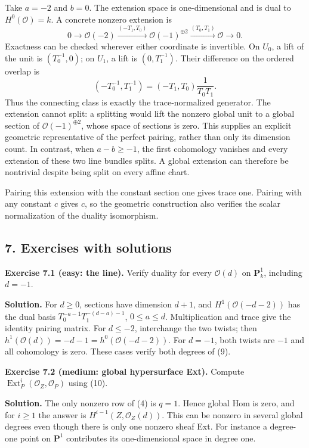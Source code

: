 \documentclass[11pt]{article}
\begin{document}
Take \(a=-2\) and \(b=0\). The extension space is one-dimensional and is
dual to \(H^0(\mathcal O)=k\). A concrete nonzero extension is \[
0\to\mathcal O(-2)
 \xrightarrow{(-T_1,T_0)}\mathcal O(-1)^{\oplus2}
 \xrightarrow{(T_0,T_1)}\mathcal O\to0.
\] Exactness can be checked wherever either coordinate is invertible. On
\(U_0\), a lift of the unit is \((T_0^{-1},0)\); on \(U_1\), a lift is
\((0,T_1^{-1})\). Their difference on the ordered overlap is \[
(-T_0^{-1},T_1^{-1})
 =(-T_1,T_0)\frac1{T_0T_1}.
\] Thus the connecting class is exactly the trace-normalized generator.
The extension cannot split: a splitting would lift the nonzero global
unit to a global section of \(\mathcal O(-1)^{\oplus2}\), whose space of
sections is zero. This supplies an explicit geometric representative of
the perfect pairing, rather than only its dimension count. In contrast,
when \(a-b\geq-1\), the first cohomology vanishes and every extension of
these two line bundles splits. A global extension can therefore be
nontrivial despite being split on every affine chart.

Pairing this extension with the constant section one gives trace one.
Pairing with any constant \(c\) gives \(c\), so the geometric
construction also verifies the scalar normalization of the duality
isomorphism.

\subsection{7. Exercises with
solutions}\label{exercises-with-solutions-12}

\textbf{Exercise 7.1 (easy: the line).} Verify duality for every
\(\mathcal O(d)\) on \(\mathbf P^1_k\), including \(d=-1\).

\textbf{Solution.} For \(d\geq0\), sections have dimension \(d+1\), and
\(H^1(\mathcal O(-d-2))\) has the dual basis
\(T_0^{-a-1}T_1^{-(d-a)-1}\), \(0\leq a\leq d\). Multiplication and
trace give the identity pairing matrix. For \(d\leq-2\), interchange the
two twists; then \(h^1(\mathcal O(d))=-d-1=h^0(\mathcal O(-d-2))\). For
\(d=-1\), both twists are \(-1\) and all cohomology is zero. These cases
verify both degrees of (9).

\textbf{Exercise 7.2 (medium: global hypersurface Ext).} Compute
\(\operatorname{Ext}^i_P(\mathcal O_Z,\mathcal O_P)\) using (10).

\textbf{Solution.} The only nonzero row of (4) is \(q=1\). Hence global
Hom is zero, and for \(i\geq1\) the answer is
\(H^{i-1}(Z,\mathcal O_Z(d))\). This can be nonzero in several global
degrees even though there is only one nonzero sheaf Ext. For instance a
degree-one point on \(\mathbf P^1\) contributes its one-dimensional
space in degree one.
\end{document}

